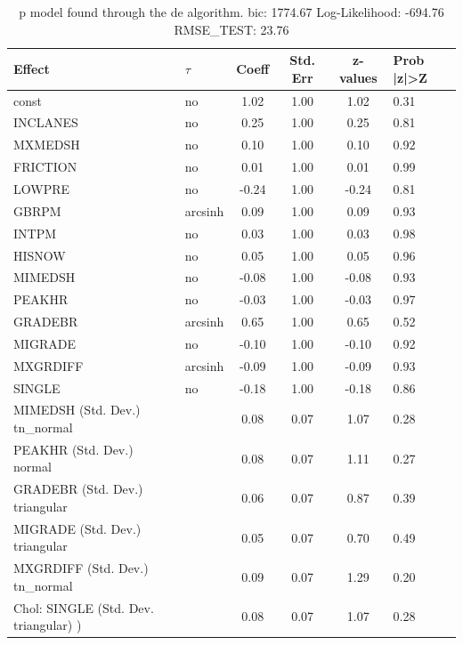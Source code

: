 \begin{table}
	\caption{p model found through the de algorithm. bic: 1774.67 Log-Likelihood: -694.76 RMSE_TEST: 23.76}
	\begin{center}
		\begin{tabular}{|l|l|c|c|c|l|}
			\hline
			Effect & $\tau$ & Coeff & Std. Err & z-values & Prob |z|>Z \\
			\hline
			const & no & 1.02 & 1.00 & 1.02 & 0.31 \\
			\hline
			INCLANES & no & 0.25 & 1.00 & 0.25 & 0.81 \\
			\hline
			MXMEDSH & no & 0.10 & 1.00 & 0.10 & 0.92 \\
			\hline
			FRICTION & no & 0.01 & 1.00 & 0.01 & 0.99 \\
			\hline
			LOWPRE & no & -0.24 & 1.00 & -0.24 & 0.81 \\
			\hline
			GBRPM & arcsinh & 0.09 & 1.00 & 0.09 & 0.93 \\
			\hline
			INTPM & no & 0.03 & 1.00 & 0.03 & 0.98 \\
			\hline
			HISNOW & no & 0.05 & 1.00 & 0.05 & 0.96 \\
			\hline
			MIMEDSH & no & -0.08 & 1.00 & -0.08 & 0.93 \\
			\hline
			PEAKHR & no & -0.03 & 1.00 & -0.03 & 0.97 \\
			\hline
			GRADEBR & arcsinh & 0.65 & 1.00 & 0.65 & 0.52 \\
			\hline
			MIGRADE & no & -0.10 & 1.00 & -0.10 & 0.92 \\
			\hline
			MXGRDIFF & arcsinh & -0.09 & 1.00 & -0.09 & 0.93 \\
			\hline
			SINGLE & no & -0.18 & 1.00 & -0.18 & 0.86 \\
			\hline
			MIMEDSH (Std. Dev.) tn_normal &  & 0.08 & 0.07 & 1.07 & 0.28 \\
			\hline
			PEAKHR (Std. Dev.) normal &  & 0.08 & 0.07 & 1.11 & 0.27 \\
			\hline
			GRADEBR (Std. Dev.) triangular &  & 0.06 & 0.07 & 0.87 & 0.39 \\
			\hline
			MIGRADE (Std. Dev.) triangular &  & 0.05 & 0.07 & 0.70 & 0.49 \\
			\hline
			MXGRDIFF (Std. Dev.) tn_normal &  & 0.09 & 0.07 & 1.29 & 0.20 \\
			\hline
			 Chol: SINGLE (Std. Dev. triangular) ) &  & 0.08 & 0.07 & 1.07 & 0.28 \\
			\hline
		\end{tabular}
	\end{center}
\end{table}